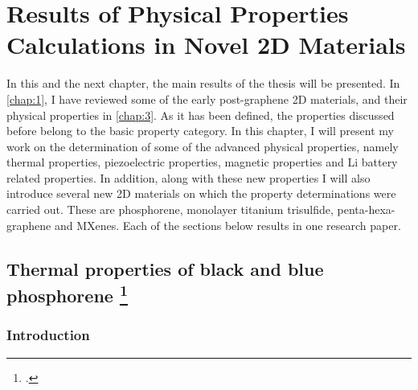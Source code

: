 
\chapter{Results of Physical Properties Calculations in Novel 2D Materials \label{chap:4}}

\ifpdf
    \graphicspath{{Chapter4/Figs/Raster/}{Chapter4/Figs/PDF/}{Chapter4/Figs/Vector/}}
\else
    \graphicspath{{Chapter4/Figs/Vector/}{Chapter4/Figs/}}
\fi


\nocite{Yimamu2012,Aierken2015.porlandite,Aierken2015.thermalP,Aierken2015.nanotubes,Menderes2015,Aierken2016.mobility,Aierken2016.pentasilicene,Aierken2016.magnetism,Aierken2017.transport,Aierken2017.battery}


In this and the next chapter, the main results of the thesis will be presented. In \autoref{chap:1}, I have reviewed some of the early post-graphene 2D materials, and their physical properties in \autoref{chap:3}. As it has been defined, the properties discussed before belong to the basic property category. In this chapter, I will present my work on the determination of some of the advanced physical properties, namely thermal properties, piezoelectric properties, magnetic properties and Li battery related properties. In addition, along with these new properties I will also introduce several new 2D materials on which the property determinations were carried out. These are phosphorene, monolayer titanium trisulfide, penta-hexa-graphene and MXenes. Each of the sections below results in one research paper. 

\section[Thermal properties of black and blue phosphorene]{Thermal properties of black and blue phosphorene \footcite[This work is published:][]{Aierken2015.thermalP} \label{thermal_phos}}


\subsection{Introduction}

